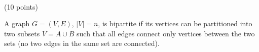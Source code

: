 \documentclass[12pt]{article}
\newcommand{\vs}{\vspace{2mm}}
\begin{document}
\begin{itemize}
\begin{itemize}
\end{itemize}

\vs\
\end{itemize} 
 
 (10 points)
\vs\

A graph $G = (V, E)$, $|V|=n$, is bipartite if its vertices can be partitioned into two subsets $V = A \cup B$ such that all edges connect only vertices between the two sets (no two edges in the same set are connected).
\end{document}
